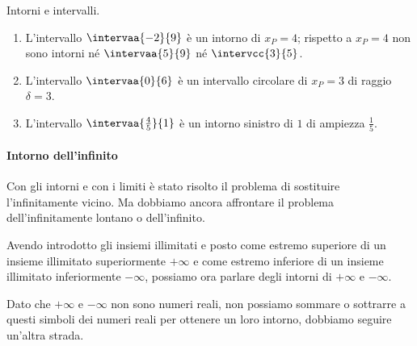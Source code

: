 \begin{center}  \end{center}



\begin{esempio} Intorni e intervalli.
\begin{enumerate}[label=\alph*)]
\item L'intervallo \(\intervaa{-2}{9}\) è un intorno di \(x_P=4\); rispetto 
a 
\(x_P=4\) non sono intorni né \(\intervaa{5}{9}\) né \(\intervcc{3}{5}\).
\item L'intervallo \(\intervaa{0}{6}\) è un intervallo circolare di 
\(x_P=3\) 
di raggio \(\delta=3\).
\item L'intervallo \(\intervaa{\frac{4}{5}}{1}\) è un intorno sinistro di 
\(1\) di ampiezza \(\frac{1}{5}\). 
\end{enumerate}
\end{esempio}

\paragraph{Intorno dell'infinito}

Con gli intorni e con i limiti è stato risolto il problema di sostituire 
l'infinitamente vicino.
Ma dobbiamo ancora affrontare il problema dell'infinitamente lontano o 
dell'infinito.

Avendo introdotto gli insiemi illimitati e posto come estremo 
superiore di un insieme illimitato superiormente \(+\infty\) e come estremo 
inferiore di un insieme illimitato inferiormente \(-\infty\), possiamo ora 
parlare degli intorni di \(+\infty\) e \(-\infty\).

Dato che \(+\infty\) e \(-\infty\) non sono numeri reali, non possiamo 
sommare o sottrarre a questi simboli dei numeri reali per ottenere un loro 
intorno, dobbiamo seguire un'altra strada.


